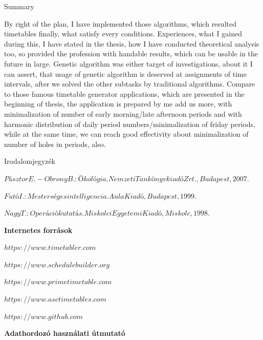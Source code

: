 \documentclass[12pt,a4paper]{report}
\begin{document}
\newpage

\huge{Summary}

By right of the plan, I have implemented those algorithms, which resulted timetables finally, what satisfy every conditions. Experiences, what I gained during this, I have stated in the thesis, how I have conducted theoretical analysis too, so provided the profession with handable results, which can be usable in the future in large. Genetic algorithm was either target of investigations, about it I can assert, that usage of genetic algorithm is deserved at assignments of time intervals, after we solved the other subtasks by traditional algorithms. Compare to those famous timetable generator applications, which are presented in the beginning of thesis, the application is prepared by me add us more, with minimalization of number of early morning/late afternoon periods and with harmonic distribution of daily period numbers/minimalization of friday periods, while at the same time, we can reach good effectivity about minimalization of number of holes in periods, also.

\newpage

\clearpage




\huge{Irodalomjegyzék}

\noindent [1]\quad $Pásztor E. - Obrony B.: Ökológia. Nemzeti Tankönyvkiadó Zrt., Budapest, 2007.$

\noindent [2]\quad $Futó I.: Mesterséges intelligencia. Aula Kiadó, Budapest, 1999.$

\noindent [3]\quad $Nagy T.: Operációkutatás. Miskolci Egyetemi Kiadó, Miskolc, 1998.$

\textbf{Internetes források}

\noindent [4]\quad $https://www.timetabler.com$

\noindent [5]\quad $https://www.schedulebuilder.org$

\noindent [6]\quad $https://www.primetimetable.com$

\noindent [7]\quad $https://www.asctimetables.com$

\noindent [8]\quad $https://www.github.com$

\newpage

\pagestyle{empty}

\noindent \textbf{\Large Adathordozó használati útmutató}

\vskip 1cm
\end{document}
